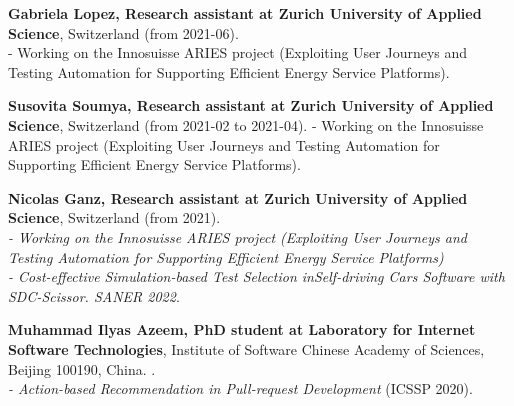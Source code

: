 \documentclass[10pt]{article}
\begin{document}
\begin{bibsection}
\item \textbf{Gabriela Lopez, Research assistant at Zurich University of Applied Science}, Switzerland (from 2021-06). \\
- Working on the Innosuisse ARIES project (Exploiting User Journeys and Testing Automation for Supporting Efficient Energy Service Platforms).\\ 

\item \textbf{Susovita Soumya, Research assistant at Zurich University of Applied Science}, Switzerland (from 2021-02 to 2021-04). 
- Working on the Innosuisse ARIES project (Exploiting User Journeys and Testing Automation for Supporting Efficient Energy Service Platforms).\\ 

\item \textbf{Nicolas Ganz, Research assistant at Zurich University of Applied Science}, Switzerland (from 2021). \\
\textit{- Working on the Innosuisse ARIES project (Exploiting User Journeys and Testing Automation for Supporting Efficient Energy Service Platforms)}\\
\textit{- Cost-effective Simulation-based Test Selection inSelf-driving Cars Software with SDC-Scissor.  SANER 2022}. 

\item \textbf{Muhammad Ilyas Azeem, PhD student at Laboratory for Internet Software Technologies}, Institute of Software Chinese Academy of Sciences, Beijing 100190, China. .\\
       \textit{- Action-based Recommendation in Pull-request Development}  (ICSSP 2020).\\


\end{bibsection}
\end{document}
